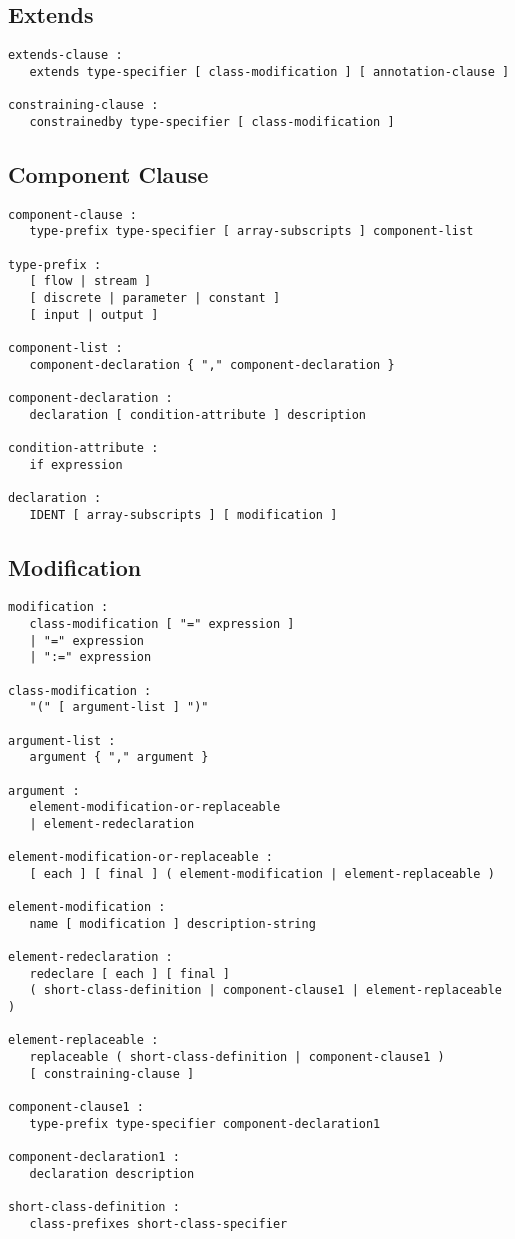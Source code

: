\subsection{Extends}\label{extends}

\begin{lstlisting}[language=grammar]
extends-clause :
   extends type-specifier [ class-modification ] [ annotation-clause ]

constraining-clause :
   constrainedby type-specifier [ class-modification ]
\end{lstlisting}

\subsection{Component Clause}\label{component-clause}

\begin{lstlisting}[language=grammar]
component-clause :
   type-prefix type-specifier [ array-subscripts ] component-list

type-prefix :
   [ flow | stream ]
   [ discrete | parameter | constant ]
   [ input | output ]

component-list :
   component-declaration { "," component-declaration }

component-declaration :
   declaration [ condition-attribute ] description

condition-attribute :
   if expression

declaration :
   IDENT [ array-subscripts ] [ modification ]
\end{lstlisting}

\subsection{Modification}\label{modification}

\begin{lstlisting}[language=grammar]
modification :
   class-modification [ "=" expression ]
   | "=" expression
   | ":=" expression

class-modification :
   "(" [ argument-list ] ")"

argument-list :
   argument { "," argument }

argument :
   element-modification-or-replaceable
   | element-redeclaration

element-modification-or-replaceable :
   [ each ] [ final ] ( element-modification | element-replaceable )

element-modification :
   name [ modification ] description-string

element-redeclaration :
   redeclare [ each ] [ final ]
   ( short-class-definition | component-clause1 | element-replaceable )

element-replaceable :
   replaceable ( short-class-definition | component-clause1 )
   [ constraining-clause ]

component-clause1 :
   type-prefix type-specifier component-declaration1

component-declaration1 :
   declaration description

short-class-definition :
   class-prefixes short-class-specifier
\end{lstlisting}

